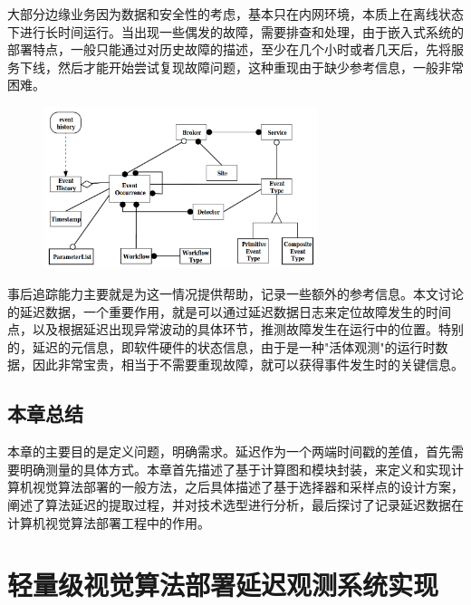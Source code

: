 \documentclass[master]{shtthesis}
\begin{document}
大部分边缘业务因为数据和安全性的考虑，基本只在内网环境，本质上在离线状态下进行长时间运行。当出现一些偶发的故障，需要排查和处理，由于嵌入式系统的部署特点，一般只能通过对历史故障的描述，至少在几个小时或者几天后，先将服务下线，然后才能开始尝试复现故障问题，这种重现由于缺少参考信息，一般非常困难。

\begin{figure}[htbp]
	\centering
	\includegraphics[width=8cm]{img/eve.png}
	\label{一种日志事件跟踪的设计方法}
\end{figure}

事后追踪能力主要就是为这一情况提供帮助，记录一些额外的参考信息。本文讨论的延迟数据，一个重要作用，就是可以通过延迟数据日志来定位故障发生的时间点，以及根据延迟出现异常波动的具体环节，推测故障发生在运行中的位置\cite{geppert1997logging}。特别的，延迟的元信息，即软件硬件的状态信息，由于是一种"活体观测"的运行时数据，因此非常宝贵，相当于不需要重现故障，就可以获得事件发生时的关键信息。

\section{本章总结}\label{本章总结}
本章的主要目的是定义问题，明确需求。延迟作为一个两端时间戳的差值，首先需要明确测量的具体方式。本章首先描述了基于计算图和模块封装，来定义和实现计算机视觉算法部署的一般方法，之后具体描述了基于选择器和采样点的设计方案，阐述了算法延迟的提取过程，并对技术选型进行分析，最后探讨了记录延迟数据在计算机视觉算法部署工程中的作用。

\chapter{轻量级视觉算法部署延迟观测系统实现}
\end{document}
